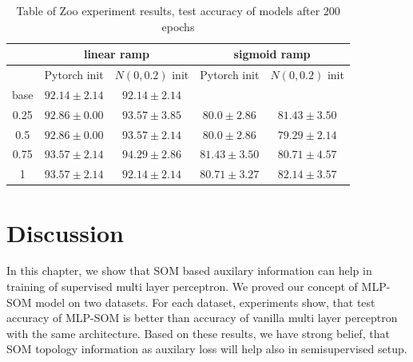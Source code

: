 \begin{table}[h!]
\centering
\begin{tabular}{|c|cc|cc|}
\hline
     & \multicolumn{2}{c|}{linear ramp} & \multicolumn{2}{c|}{sigmoid ramp} \\ \hline
 & \multicolumn{1}{c|}{Pytorch init} & $N(0, 0.2)$ init & \multicolumn{1}{c|}{Pytorch init} & $N(0, 0.2)$ init \\ \hline
base  & \multicolumn{1}{c|}{$92.14\pm 2.14$}    &   $92.14\pm 2.14$   & \multicolumn{1}{c|}{}      &       \\ \hline
0.25  & \multicolumn{1}{c|}{$92.86\pm 0.00$}     &   $93.57\pm 3.85$   & \multicolumn{1}{c|}{$80.0	\pm 2.86$}      &  $81.43\pm 3.50$     \\ \hline
 0.5  & \multicolumn{1}{c|}{$92.86\pm 0.00$}     &   $93.57\pm 2.14$   & \multicolumn{1}{c|}{$80.0	\pm 2.86$}      &  $79.29\pm 2.14$    \\ \hline
0.75  & \multicolumn{1}{c|}{$93.57\pm 2.14$}    &  $94.29\pm 2.86$    & \multicolumn{1}{c|}{$81.43	\pm 3.50$}      &   $80.71\pm 4.57$    \\ \hline
   1  & \multicolumn{1}{c|}{$93.57	\pm 2.14$}   &  $92.14\pm 2.14$    & \multicolumn{1}{c|}{ $80.71	\pm 3.27$}      &   $82.14	\pm 3.57$     \\ \hline

\end{tabular}
\caption{Table of Zoo experiment results, test accuracy of models after 200 epochs}
\label{tab:zoo}
\end{table}

\section{Discussion}
In this chapter, we show that SOM based auxilary information can help in training of supervised multi layer perceptron. We proved our concept of MLP-SOM model on two datasets. For each dataset, experiments show, that test accuracy of MLP-SOM is better than accuracy of vanilla multi layer perceptron with the same architecture. Based on these results, we have strong belief, that SOM topology information as auxilary loss will help also in semisupervised setup.